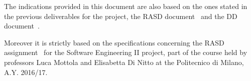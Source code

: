 
The indications provided in this document are also based on the ones stated in the previous deliverables for the project, the RASD document~\cite{rasd} and the DD document~\cite{dd}.

Moreover it is strictly based on the specifications concerning the RASD assignment~\cite{se-assignments} for the Software Engineering II project, part of the course held by professors Luca Mottola and Elisabetta Di Nitto at the Politecnico di Milano, A.Y. 2016/17.